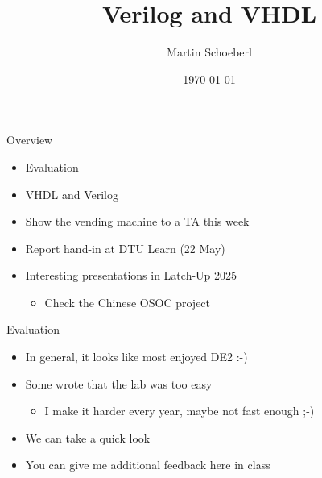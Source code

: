 

\newif\ifbook


\title{Verilog and VHDL}
\author{Martin Schoeberl}
\date{\today}



\begin{frame}
\titlepage
\end{frame}


\begin{frame}[fragile]{Overview}
\begin{itemize}
\item Evaluation
\item VHDL and Verilog
\item Show the vending machine to a TA this week
\item Report hand-in at DTU Learn (22 May)
\item Interesting presentations in \href{https://fossi-foundation.org/latch-up/2025}{Latch-Up 2025}
\begin{itemize}
\item Check the Chinese OSOC project
\end{itemize}
\end{itemize}
\end{frame}




\begin{frame}[fragile]{Evaluation}
\begin{itemize}
\item In general, it looks like most enjoyed DE2 :-)
\item Some wrote that the lab was too easy
\begin{itemize}
\item I make it harder every year, maybe not fast enough ;-)
\end{itemize}
\item We can take a quick look
\item You can give me additional feedback here in class
\end{itemize}
\end{frame}



